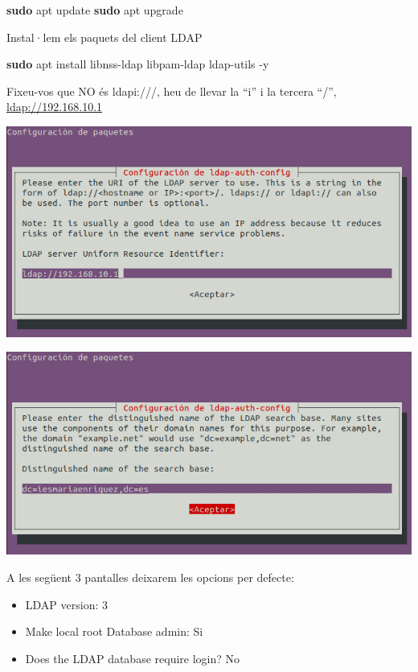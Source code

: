 \documentclass[
  12 pt,
  a4paper,
]{article}
\newenvironment{Shaded}{\begin{snugshade}}{\end{snugshade}}
\newcommand{\AttributeTok}[1]{\textcolor[rgb]{0.13,0.29,0.53}{#1}}
\newcommand{\FunctionTok}[1]{\textcolor[rgb]{0.13,0.29,0.53}{\textbf{#1}}}
\newcommand{\NormalTok}[1]{#1}
\begin{document}
\begin{Shaded}
\begin{Highlighting}[]
\FunctionTok{sudo}\NormalTok{ apt update}
\FunctionTok{sudo}\NormalTok{ apt upgrade}
\end{Highlighting}
\end{Shaded}

Instal·lem els paquets del client LDAP

\begin{Shaded}
\begin{Highlighting}[]
\FunctionTok{sudo}\NormalTok{ apt install libnss{-}ldap libpam{-}ldap ldap{-}utils }\AttributeTok{{-}y}
\end{Highlighting}
\end{Shaded}

Fixeu-vos que NO és ldapi:///, heu de llevar la ``i'' i la tercera
``/'', \url{ldap://192.168.10.1}

\includegraphics{png/libpam1.png}

\includegraphics{png/libpam2.png}

A les següent 3 pantalles deixarem les opcions per defecte:

\begin{itemize}
\item
  LDAP version: 3
\item
  Make local root Database admin: Si
\item
  Does the LDAP database require login? No
\end{itemize}
\end{document}
